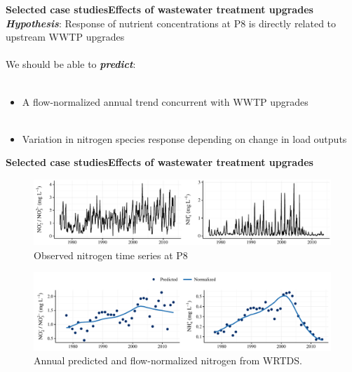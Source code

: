 \documentclass[serif]{beamer}\usepackage[]{graphicx}\usepackage[]{color}
\newcommand{\emtxt}[1]{\textbf{\textit{#1}}}
\begin{document}
\begin{frame}{\textbf{Selected case studies}}{\textbf{Effects of wastewater treatment upgrades}}
\emtxt{Hypothesis}: Response of nutrient concentrations at P8 is directly related to upstream WWTP upgrades \\~\\
We should be able to \emtxt{predict}: \\~\\
\begin{itemize}
\item A flow-normalized annual trend concurrent with WWTP upgrades \\~\\
\item Variation in nitrogen species response depending on change in load outputs
\end{itemize}
\end{frame}



\begin{frame}{\textbf{Selected case studies}}{\textbf{Effects of wastewater treatment upgrades}}
\onslide<+->
\begin{figure}
\centerline{\includegraphics[width = \textwidth]{fig/p8obs.pdf}}
\caption{Observed nitrogen time series at P8}
\end{figure}
\onslide<+->
\vspace{-0.35in}
\begin{figure}
\centerline{\includegraphics[width = \textwidth]{fig/p8prdnrm.pdf}}
\caption{Annual predicted and flow-normalized nitrogen from WRTDS.}
\end{figure}
\end{frame}
\end{document}

